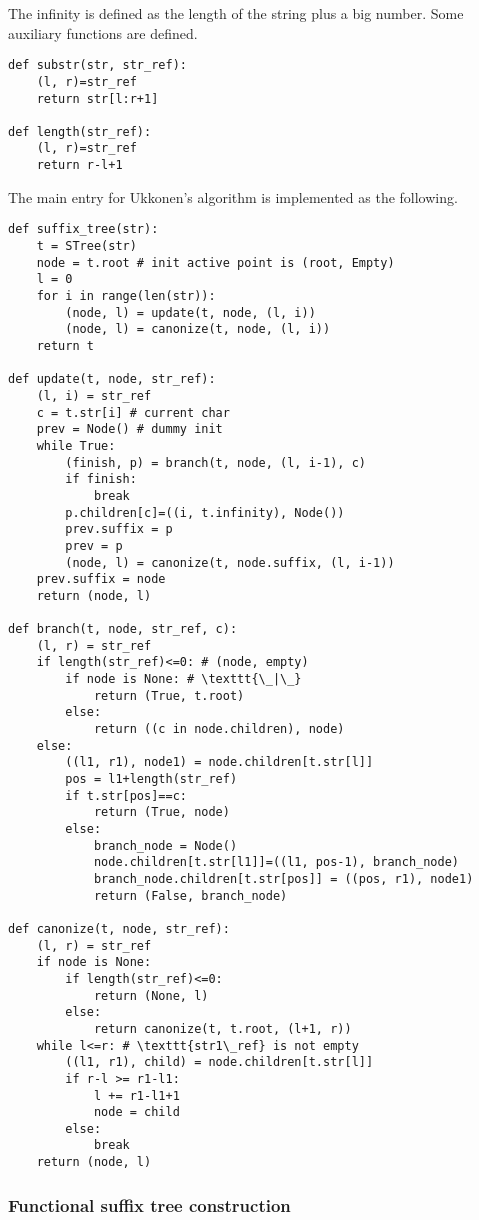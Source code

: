 \documentclass{article}
\begin{document}
The infinity is defined as the length of the string plus a big number.
Some auxiliary functions are defined.

\begin{lstlisting}
def substr(str, str_ref):
    (l, r)=str_ref
    return str[l:r+1]

def length(str_ref):
    (l, r)=str_ref
    return r-l+1
\end{lstlisting}

The main entry for Ukkonen's algorithm is implemented as the following.

\begin{lstlisting}
def suffix_tree(str):
    t = STree(str)
    node = t.root # init active point is (root, Empty)
    l = 0
    for i in range(len(str)):
        (node, l) = update(t, node, (l, i))
        (node, l) = canonize(t, node, (l, i))
    return t

def update(t, node, str_ref):
    (l, i) = str_ref
    c = t.str[i] # current char
    prev = Node() # dummy init
    while True:
        (finish, p) = branch(t, node, (l, i-1), c)
        if finish:
            break
        p.children[c]=((i, t.infinity), Node())
        prev.suffix = p
        prev = p
        (node, l) = canonize(t, node.suffix, (l, i-1))
    prev.suffix = node
    return (node, l)

def branch(t, node, str_ref, c):
    (l, r) = str_ref
    if length(str_ref)<=0: # (node, empty)
        if node is None: # \texttt{\_|\_}
            return (True, t.root)
        else:
            return ((c in node.children), node)
    else:
        ((l1, r1), node1) = node.children[t.str[l]]
        pos = l1+length(str_ref)
        if t.str[pos]==c:
            return (True, node)
        else:
            branch_node = Node()
            node.children[t.str[l1]]=((l1, pos-1), branch_node)
            branch_node.children[t.str[pos]] = ((pos, r1), node1)
            return (False, branch_node)

def canonize(t, node, str_ref):
    (l, r) = str_ref
    if node is None:
        if length(str_ref)<=0:
            return (None, l)
        else:
            return canonize(t, t.root, (l+1, r))
    while l<=r: # \texttt{str1\_ref} is not empty
        ((l1, r1), child) = node.children[t.str[l]]
        if r-l >= r1-l1:
            l += r1-l1+1
            node = child
        else:
            break
    return (node, l)
\end{lstlisting}

\subsubsection{Functional suffix tree construction}
\end{document}
